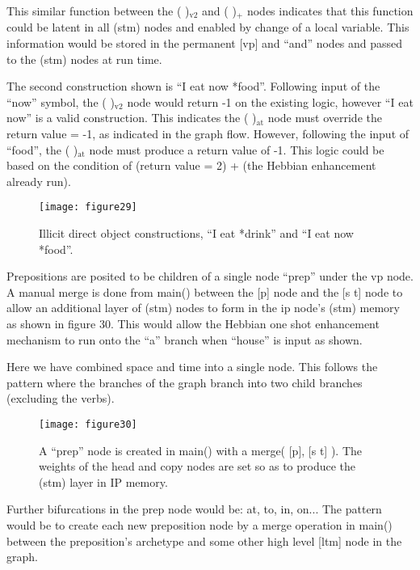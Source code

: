 \documentclass{clv3}
\begin{document}
This similar function between the ( )$_{\mathrm{v2}}$ and ( )$_+$ nodes indicates that this function could be latent in all (stm) nodes and enabled by change of a local variable.   This information would be stored in the permanent [vp] and ``and'' nodes and passed to the (stm) nodes at run time.  


The second construction shown is ``I eat now *food''.    Following input of the ``now'' symbol, the ( )$_{\mathrm{v2}}$ node would return -1 on the existing logic, however ``I eat now'' is a valid construction.   This indicates the ( )$_{\mathrm{at}}$ node must override the return value = -1, as indicated in the graph flow.   However, following the input of ``food'', the ( )$_{\mathrm{at}}$ node must produce a return value of -1.     This logic could be based on the condition of (return value = 2) + (the Hebbian enhancement already run).





\begin{figure}
\texttt{[image: figure29]}
\caption{ Illicit direct object constructions, “I eat *drink” and “I eat now *food”.}
\end{figure}


Prepositions are posited to be children of a single node ``prep'' under the vp node.    A manual merge is done from main() between the [p] node and the [s t] node to allow an additional layer of (stm) nodes to form in the ip node's (stm) memory as shown in figure 30.    This would allow the Hebbian one shot enhancement mechanism to run onto the ``a'' branch when ``house'' is input as shown.

Here we have combined space and time into a single node.   This follows the pattern where the branches of the graph branch into two child branches (excluding the verbs).





\begin{figure}[H]
\texttt{[image: figure30]}
\caption{A ``prep'' node is created in main() with a merge( [p], [s t] ).   The weights of the head and copy nodes are set so as to produce the (stm) layer in IP memory.}
\end{figure}

Further bifurcations in the prep node would be:  at, to, in, on...  The pattern would be to create each new preposition node by a merge operation in main() between the preposition's archetype and some other high level [ltm] node in the graph.   
\end{document}
